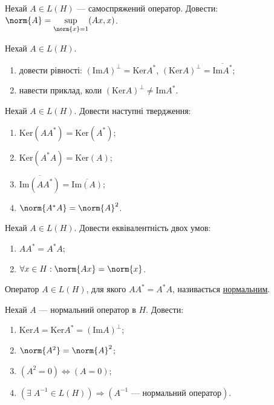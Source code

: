 
\begin{exercise}
    Нехай $A \in L(H)$ --- самоспряжений оператор.
    Довести: $\norm{A} = \underset{\norm{x} = 1}{\sup}(Ax, x)$.
\end{exercise}

\begin{exercise}
    Нехай $A \in L(H)$.
    \begin{enumerate}[label=\ukr*)]
        \item довести рівності: $(\mathrm{Im}A)^\perp = \mathrm{Ker}A^*$, $(\mathrm{Ker}A)^\perp = \overline{\mathrm{Im}A^*}$;
        \item навести приклад, коли $(\mathrm{Ker}A)^\perp \neq \mathrm{Im}A^*$.
    \end{enumerate}
\end{exercise}

\begin{exercise}
    Нехай $A \in L(H)$. Довести наступні твердження:
    \begin{enumerate}[label=\ukr*)]
        \item $\mathrm{Ker}(A A^*) = \mathrm{Ker}(A^*)$;
        \item $\mathrm{Ker}(A^* A) = \mathrm{Ker}(A)$;
        \item $\overline{\mathrm{Im} (A A^*)} = \overline{\mathrm{Im} (A)}$;
        \item $\norm{A^* A} = \norm{A}^2$.
    \end{enumerate}
\end{exercise}

\begin{exercise}
    Нехай $A \in L(H)$. Довести еквівалентність двох умов:
    \begin{enumerate}[label=\ukr*)]
        \item $A A^* = A^* A$;
        \item $\forall x \in H : \norm{Ax} = \norm{x}$.
    \end{enumerate}
\end{exercise}

\begin{theory}
    Оператор $A \in L(H)$, для якого $A A^* = A^* A$, називається \uline{нормальним}.
\end{theory}

\begin{exercise}
    Нехай $A$ --- нормальний оператор в $H$. Довести:
    \begin{enumerate}[label=\ukr*)]
        \item $\mathrm{Ker} A = \mathrm{Ker} A^* = (\mathrm{Im} A)^\perp$;
        \item $\norm{A^2} = \norm{A}^2$;
        \item $(A^2 = 0) \Leftrightarrow (A = 0)$;
        \item $\left( \exists \; A^{-1} \in L(H)\right) \Rightarrow (A^{-1} \text{ --- нормальний оператор})$.
    \end{enumerate}
\end{exercise}

